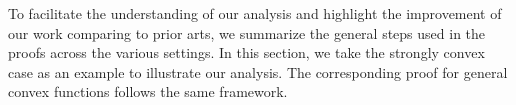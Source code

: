 




To facilitate the understanding of our analysis and highlight the improvement of our work comparing to prior arts, we summarize the general steps 
used in the proofs across the various settings. In this section,
we take the strongly convex case as an example to illustrate our analysis. The corresponding proof for general convex functions follows the 
same framework.  

